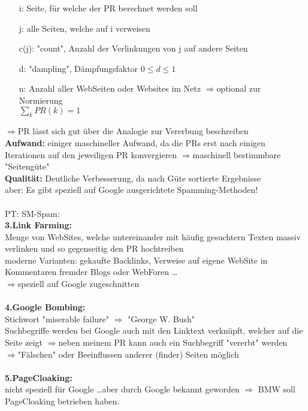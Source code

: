 \begin{itemize}
\item[i:] Seite, für welche der PR berechnet werden soll
\item[j:] alle Seiten, welche auf i verweisen
\item[c(j):] "count", Anzahl der Verlinkungen von j auf andere Seiten
\item[d:] "dampling", Dämpfungsfaktor \(0 \le d \le 1\)
\item[n:] Anzahl aller WebSeiten oder Websites im Netz $\Rightarrow$optional zur Normierung\\
\(\sum \limits_{k}PR(k)=1\)
\end{itemize}
$\Rightarrow$PR lässt sich gut über die Analogie zur Vererbung beschreiben\\
\textbf{Aufwand:} einiger maschineller Aufwand, da die PRs erst nach einigen Iterationen auf den jeweiligen PR konvergieren $\Rightarrow$maschinell bestimmbare "Seitengüte"\\
\textbf{Qualität:} Deutliche Verbesserung, da nach Güte sortierte Ergebnisse\\
aber: Es gibt speziell auf Google ausgerichtete Spamming-Methoden!\\
\\
PT: SM-Spam:\\
\textbf{3.Link Farming:}\\
Menge von WebSites, welche untereinander mit häufig gesuchtern Texten massiv verlinken und so gegenseitig den PR hochtreiben\\
moderne Varianten: gekaufte Backlinks, Verweise auf eigene WebSite in Kommentaren fremder Blogs oder WebForen \dots\\
$\Rightarrow$speziell auf Google zugeschnitten\\
\\
\textbf{4.Google Bombing:}\\
Stichwort "miserable failure" $\Rightarrow$ "George W. Bush"\\
Suchbegriffe werden bei Google auch mit den Linktext verknüpft, welcher auf die Seite zeigt $\Rightarrow$neben meinem PR kann auch ein Suchbegriff "vererbt" werden\\
$\Rightarrow$"Fälschen" oder Beeinflussen anderer (finder) Seiten möglich\\
\\
\textbf{5.PageCloaking:}\\
nicht speziell für Google \dots aber durch Google bekannt geworden $\Rightarrow$ BMW soll PageCloaking betrieben haben.\\
